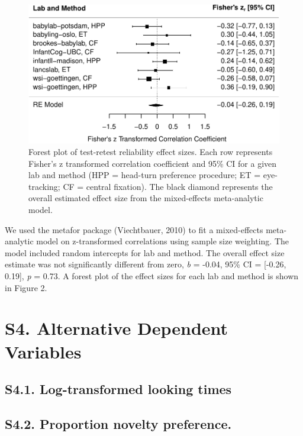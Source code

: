 \documentclass[
  man, donotrepeattitle,floatsintext]{apa6}
\begin{document}
\begin{figure}
\centering
\includegraphics{MB1T_supplement_files/figure-latex/fig2-1.pdf}
\caption{\label{fig:fig2}Forest plot of test-retest reliability effect sizes. Each row represents Fisher's z transformed correlation coefficient and 95\% CI for a given lab and method (HPP = head-turn preference procedure; ET = eye-tracking; CF = central fixation). The black diamond represents the overall estimated effect size from the mixed-effects meta-analytic model.}
\end{figure}

We used the metafor package (Viechtbauer, 2010) to fit a mixed-effects meta-analytic model on z-transformed correlations using sample size weighting. The model included random intercepts for lab and method. The overall effect size estimate was not significantly different from zero, \emph{b} = -0.04, 95\% CI = {[}-0.26, 0.19{]}, \emph{p} = 0.73. A forest plot of the effect sizes for each lab and method is shown in Figure 2.

\hypertarget{s4.-alternative-dependent-variables}{%
\section{S4. Alternative Dependent Variables}\label{s4.-alternative-dependent-variables}}

\hypertarget{s4.1.-log-transformed-looking-times}{%
\subsection{S4.1. Log-transformed looking times}\label{s4.1.-log-transformed-looking-times}}

\hypertarget{s4.2.-proportion-novelty-preference.}{%
\subsection{S4.2. Proportion novelty preference.}\label{s4.2.-proportion-novelty-preference.}}
\end{document}
